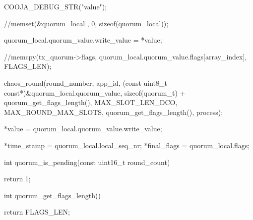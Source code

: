 {


COOJA_DEBUG_STR("value");

//memset(&quorum_local , 0, sizeof(quorum_local));

quorum_local.quorum_value.write_value = *value;



//memcpy(tx_quorum->flags, quorum_local.quorum_value.flags[array_index], FLAGS_LEN);

chaos_round(round_number, app_id, (const uint8_t const*)&quorum_local.quorum_value, sizeof(quorum_t) + quorum_get_flags_length(), MAX_SLOT_LEN_DCO, MAX_ROUND_MAX_SLOTS, quorum_get_flags_length(), process);

*value = quorum_local.quorum_value.write_value;

*time_stamp = quorum_local.local_seq_nr;
*final_flags = quorum_local.flags;


}


int quorum_is_pending(const uint16_t round_count){
return 1;

}


int quorum_get_flags_length() {

  return FLAGS_LEN;

}
